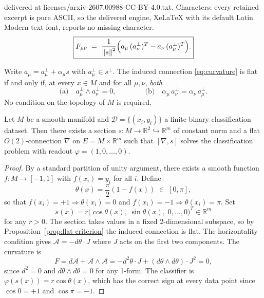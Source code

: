 \documentclass[10pt,a4paper]{amsart}
\newcommand{\R}{\mathbb{R}}
\newcommand{\Sig}{\mathcal{A}}
\newcommand{\norm}[1]{\left\|#1\right\|}
\begin{document}
delivered at licenses/arxiv-2607.00988-CC-BY-4.0.txt. Characters: every retained excerpt is pure ASCII, so the delivered engine, XeLaTeX with its default Latin Modern text font, reports no missing character.
\begin{equation}\label{eq:curvature}
  \boxed{F_{\mu\nu}
  \;=\; \frac{1}{\norm{s}^2}
        \Bigl(a_\mu\,(a_\nu^\perp)^T - a_\nu\,(a_\mu^\perp)^T\Bigr).}
\end{equation}

\begin{proposition}\label{prop:flat-criterion}
Write $a_\mu = a_\mu^\perp + \alpha_\mu s$ with $a_\mu^\perp \in s^\perp$. The
induced connection \eqref{eq:curvature} is flat if and only if, at every
$x \in M$ and for all $\mu,\nu$, \emph{both}
\[
  \text{(a)}\quad a_\mu^\perp \wedge a_\nu^\perp = 0,
  \qquad\qquad
  \text{(b)}\quad \alpha_\mu\, a_\nu^\perp = \alpha_\nu\, a_\mu^\perp .
\]
No condition on the topology of $M$ is required.
\end{proposition}

\begin{theorem}\label{thm:flat}
Let $M$ be a smooth manifold and $\mathcal{D} = \{(x_i, y_i)\}$ a finite binary
classification dataset. Then there exists a section $s: M \to \R^2
\hookrightarrow \R^m$ of constant norm and a flat $O(2)$-connection $\nabla$ on
$E = M \times \R^m$ such that $[\nabla, s]$ solves the classification problem
with readout $\varphi = (1,0,\ldots,0)$.
\end{theorem}

\begin{proof}
By a standard partition of unity argument, there exists a smooth function
$f: M \to [-1,1]$ with $f(x_i) = y_i$ for all $i$. Define
\[
  \theta(x) = \frac{\pi}{2}(1 - f(x)) \;\in\; [0,\pi],
\]
so that $f(x_i) = +1 \Rightarrow \theta(x_i) = 0$ and $f(x_i) = -1 \Rightarrow
\theta(x_i) = \pi$. Set
\[
  s(x) = r\bigl(\cos\theta(x),\;\sin\theta(x),\;0,\ldots,0\bigr)^T \in \R^m
\]
for any $r > 0$. The section takes values in a fixed 2-dimensional subspace, so
by Proposition~\ref{prop:flat-criterion} the induced connection is flat. The
horizontality condition gives $\Sig = -d\theta \cdot J$ where $J$ acts on the
first two components. The curvature is
\[
  F = d\Sig + \Sig\wedge\Sig = -d^2\theta\cdot J + (d\theta\wedge d\theta)\cdot J^2 = 0,
\]
since $d^2 = 0$ and $d\theta\wedge d\theta = 0$ for any 1-form. The classifier is
$\varphi(s(x)) = r\cos\theta(x)$, which has the correct sign at every data point
since $\cos 0 = +1$ and $\cos\pi = -1$.
\end{proof}
\end{document}
